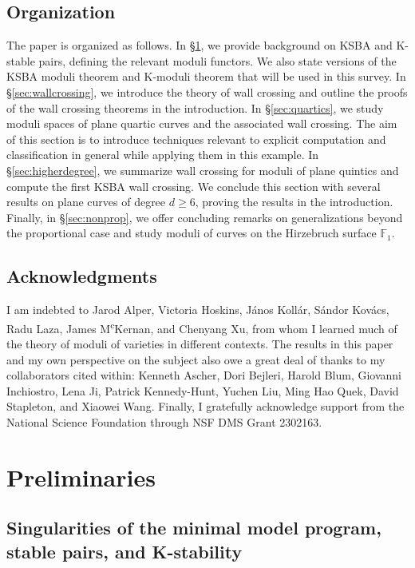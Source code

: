 \documentclass[11pt]{amsart}
\numberwithin{equation}{section}
\theoremstyle{definition}
\newcommand{\bF}{\mathbb{F}}
\begin{document}
\subsection*{Organization} The paper is organized as follows.  In \S \ref{sec:preliminaries}, we provide background on KSBA and K-stable pairs, defining the relevant moduli functors.  We also state versions of the KSBA moduli theorem and K-moduli theorem that will be used in this survey.  In \S \ref{sec:wallcrossing}, we introduce the theory of wall crossing and outline the proofs of the wall crossing theorems in the introduction.  In \S \ref{sec:quartics}, we study moduli spaces of plane quartic curves and the associated wall crossing.  The aim of this section is to introduce techniques relevant to explicit computation and classification in general while applying them in this example.  In \S \ref{sec:higherdegree}, we summarize wall crossing for moduli of plane quintics and compute the first KSBA wall crossing.  We conclude this section with several results on plane curves of degree $d \ge 6$, proving the results in the introduction.  Finally, in \S \ref{sec:nonprop}, we offer concluding remarks on generalizations beyond the proportional case and study moduli of curves on the Hirzebruch surface $\bF_1$. 

\subsection*{Acknowledgments} I am indebted to Jarod Alper, Victoria Hoskins, J\'anos Koll\'ar, S\'andor Kov\'acs, Radu Laza, James M\textsuperscript{c}Kernan, and Chenyang Xu, from whom I learned much of the theory of moduli of varieties in different contexts.  The results in this paper and my own perspective on the subject also owe a great deal of thanks to my collaborators cited within: Kenneth Ascher, Dori Bejleri, Harold Blum, Giovanni Inchiostro, Lena Ji, Patrick Kennedy-Hunt, Yuchen Liu, Ming Hao Quek, David Stapleton, and Xiaowei Wang. Finally, I gratefully acknowledge support from the National Science Foundation through NSF DMS Grant 2302163.

\tableofcontents

\section{Preliminaries}\label{sec:preliminaries}

\subsection{Singularities of the minimal model program, stable pairs, and K-stability}
\end{document}
